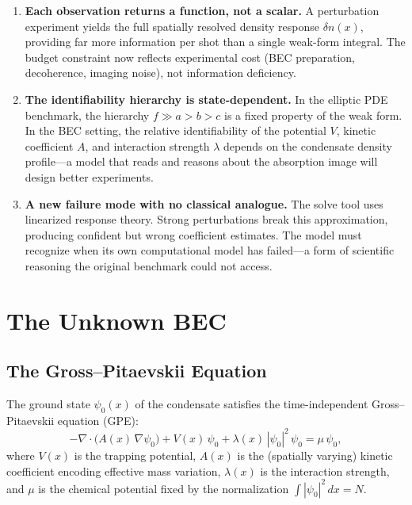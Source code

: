 \documentclass[11pt]{article}
\begin{document}
\begin{enumerate}[leftmargin=2em]
\item \textbf{Each observation returns a function, not a scalar.} A perturbation experiment yields the full spatially resolved density response $\delta n(x)$, providing far more information per shot than a single weak-form integral. The budget constraint now reflects experimental cost (BEC preparation, decoherence, imaging noise), not information deficiency.

\item \textbf{The identifiability hierarchy is state-dependent.} In the elliptic PDE benchmark, the hierarchy $f \gg a > b > c$ is a fixed property of the weak form. In the BEC setting, the relative identifiability of the potential $V$, kinetic coefficient $A$, and interaction strength $\lambda$ depends on the condensate density profile---a model that reads and reasons about the absorption image will design better experiments.

\item \textbf{A new failure mode with no classical analogue.} The solve tool uses linearized response theory. Strong perturbations break this approximation, producing confident but wrong coefficient estimates. The model must recognize when its own computational model has failed---a form of scientific reasoning the original benchmark could not access.
\end{enumerate}

\section{The Unknown BEC}

\subsection{The Gross--Pitaevskii Equation}

The ground state $\psi_0(x)$ of the condensate satisfies the time-independent Gross--Pitaevskii equation (GPE):
\begin{equation}\label{eq:gpe}
-\nabla \cdot \bigl(A(x)\,\nabla\psi_0\bigr) + V(x)\,\psi_0 + \lambda(x)\,|\psi_0|^2\,\psi_0 = \mu\,\psi_0,
\end{equation}
where $V(x)$ is the trapping potential, $A(x)$ is the (spatially varying) kinetic coefficient encoding effective mass variation, $\lambda(x)$ is the interaction strength, and $\mu$ is the chemical potential fixed by the normalization $\int|\psi_0|^2\,dx = N$.
\end{document}

